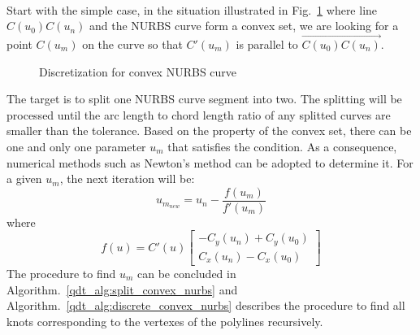 \paragraph{}
Start with the simple case, in the situation illustrated in Fig.~\ref{qt_fig:iges_chord_split_convex_sum} where line $C(u_0)C(u_n)$ and the NURBS curve form a convex set, we are looking for a point $C(u_m)$ on the curve so that $C'(u_m)$ is parallel to $\overrightarrow{C(u_0)C(u_n)}$.
    \begin{figure}[h!]
        \centering
        \caption{Discretization for convex NURBS curve}
        \label{qt_fig:iges_chord_split_convex_sum}
    \end{figure}
%
The target is to split one NURBS curve segment into two.
The splitting will be processed until the arc length to chord length ratio of any splitted curves are smaller than the tolerance.
Based on the property of the convex set, there can be one and only one parameter $u_m$ that satisfies the condition.
As a consequence, numerical methods such as Newton's method can be adopted to determine it.
For a given $u_m$, the next iteration will be:
    \begin{equation}
        u_{m_{new}} =  u_n - \frac{f(u_m)}{f'(u_m)}
    \end{equation}
%
where 
    \begin{equation}
        f(u) = C'(u) \begin{bmatrix}
            - C_y(u_n) + C_y(u_0) \\
            C_x(u_n) - C_x(u_0)
        \end{bmatrix}
    \end{equation}
%
The procedure to find $u_m$ can be concluded in Algorithm.~\ref{qdt_alg:split_convex_nurbs} and Algorithm.~\ref{qdt_alg:discrete_convex_nurbs} describes the procedure to find all knots corresponding to the vertexes of the polylines recursively.
